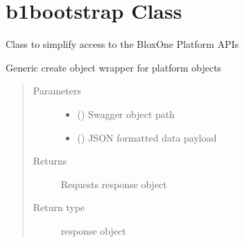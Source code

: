 \documentclass[letterpaper,10pt,english]{sphinxmanual}
\begin{document}
\section{b1bootstrap Class}
\label{\detokenize{b1bootstrap-class:b1bootstrap-class}}\label{\detokenize{b1bootstrap-class::doc}}

\begin{fulllineitems}
\label{\detokenize{b1bootstrap-class:bloxone.b1bootstrap}}
\sphinxAtStartPar
Class to simplify access to the BloxOne Platform APIs

\begin{fulllineitems}
\label{\detokenize{b1bootstrap-class:bloxone.b1bootstrap.create}}
\sphinxAtStartPar
Generic create object wrapper for platform objects
\begin{quote}\begin{description}
\item[{Parameters}] \leavevmode\begin{itemize}
\item {} 
\sphinxAtStartPar
{} () \textendash{} Swagger object path

\item {} 
\sphinxAtStartPar
{} () \textendash{} JSON formatted data payload

\end{itemize}

\item[{Returns}] \leavevmode
\sphinxAtStartPar
Requests response object

\item[{Return type}] \leavevmode
\sphinxAtStartPar
response object

\end{description}\end{quote}


\end{fulllineitems}
\end{fulllineitems}
\end{document}
